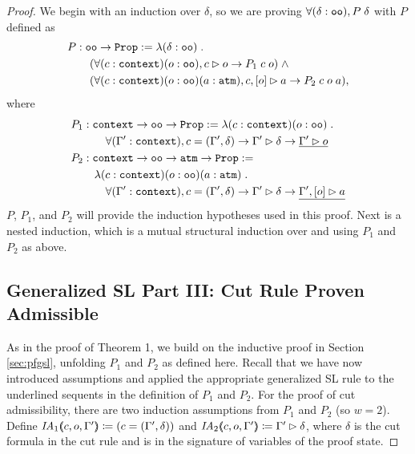 \begin{proof}

We begin with an induction over $\delta$, so we are proving $\forall (\delta : \sltm{oo}), P \; \delta$ with $P$ defined as
\begin{align*}
& P : \sltm{oo} \rightarrow \hybridtm{Prop} := \lambda (\delta : \sltm{oo}) \; . \\
& \qquad (\forall (c : \sltm{context}) (o : \sltm{oo}), \seqsl[c]{o} \rightarrow P_1 \; c \; o) \; \wedge \\
& \qquad (\forall (c : \sltm{context}) (o : \sltm{oo}) (a : \hybridtm{atm}), \bchsl[c]{o}{a} \rightarrow P_2 \; c \; o \; a),
\end{align*}
where
\begin{align*}
P_1 &: \sltm{context} \rightarrow \sltm{oo} \rightarrow \coqtm{Prop} := \lambda (c : \sltm{context}) (o : \sltm{oo}) \; . \\
& \qquad \forall (\inddyncon{} : \sltm{context}), c = (\inddyncon{}, \delta) \rightarrow \seqsl[\inddyncon{}]{\delta} \rightarrow \underline{\seqsl[\inddyncon{}]{o}} \\
P_2 &: \sltm{context} \rightarrow \sltm{oo} \rightarrow \sltm{atm} \rightarrow \coqtm{Prop} := \\
& \quad \lambda (c : \sltm{context}) (o : \sltm{oo}) (a : \sltm{atm}) \; . \\
& \qquad \forall (\inddyncon{} : \sltm{context}), c = (\inddyncon{}, \delta) \rightarrow \seqsl[\inddyncon{}]{\delta} \rightarrow \underline{\bchsl[\inddyncon{}]{o}{a}}
\end{align*}
$P$, $P_1$, and $P_2$ will provide the induction hypotheses used in this proof. Next is a nested induction, which is a mutual structural induction over  and  using $P_1$ and $P_2$ as above.

\subsection{Generalized SL Part III: Cut Rule Proven Admissible}
\label{subsec:cutpf}

As in the proof of Theorem 1, we build on the inductive proof in Section \ref{sec:pfgsl}, unfolding $P_1$ and $P_2$ as defined here.
Recall that we have now introduced assumptions and applied the appropriate generalized SL rule to the underlined sequents in the definition of $P_1$ and $P_2$. For the proof of cut admissibility, there are two induction assumptions from $P_1$ and $P_2$ (so $w = 2$). Define $\mathit{IA}_1 \args{c , o , \inddyncon{}} \coloneqq (c = (\inddyncon{} , \delta))$ and $\mathit{IA}_2 \args{c , o , \inddyncon{}} \coloneqq \seqsl[\inddyncon{}]{\delta}$, where $\delta$ is the cut formula in the cut rule and is in the signature of variables of the proof state.


\end{proof}
